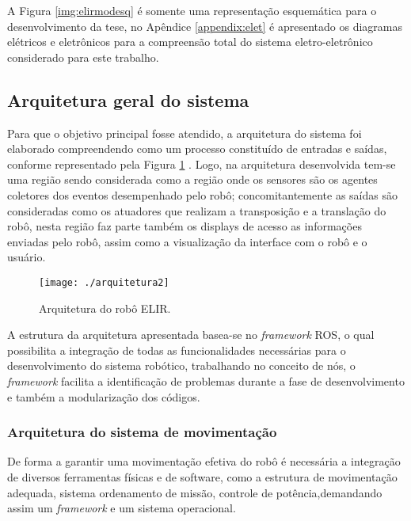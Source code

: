 A Figura \ref{img:elirmodesq} é somente uma representação esquemática para o desenvolvimento da tese, no Apêndice \ref{appendix:elet} é apresentado os diagramas elétricos e eletrônicos para a compreensão total do sistema eletro-eletrônico considerado para este trabalho.



\subsection{Arquitetura geral do sistema}
\label{ssec:arqg}
Para que o objetivo principal fosse atendido, a arquitetura do sistema foi elaborado compreendendo como um processo constituído de entradas e saídas, conforme representado pela Figura \ref{img:elirarq} . Logo, na arquitetura desenvolvida tem-se uma região sendo considerada como a região onde os sensores são os agentes coletores dos eventos desempenhado pelo robô; concomitantemente as saídas são consideradas como os atuadores que realizam a transposição e a translação do robô, nesta região faz parte também os displays de acesso as informações enviadas pelo robô, assim como a visualização da interface com o robô e o usuário.

\begin{figure} [h!]	
	\caption{Arquitetura do robô ELIR.}
	\label{img:elirarq}											 
	\centering													 
	\texttt{[image: ./arquitetura2]}
\end{figure}													 



A estrutura da arquitetura apresentada basea-se no \textit{framework} ROS, o qual possibilita a integração de todas as funcionalidades necessárias para o desenvolvimento do sistema robótico, trabalhando no conceito de nós, o \textit{framework} facilita a identificação de problemas durante a fase de desenvolvimento e também a modularização dos códigos.

\subsubsection{Arquitetura do sistema de movimentação}
De forma a garantir uma movimentação efetiva do robô é necessária a integração de diversos ferramentas físicas e de software, como a estrutura de movimentação adequada, sistema ordenamento de missão, controle de potência,demandando assim um \textit{framework} e um sistema operacional.

